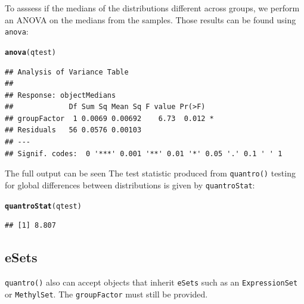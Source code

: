 \documentclass{article}\usepackage[]{graphicx}\usepackage[usenames,dvipsnames]{color}
\makeatletter
\newcommand{\hlstd}[1]{\textcolor[rgb]{0.345,0.345,0.345}{#1}}%
\newcommand{\hlkwd}[1]{\textcolor[rgb]{0.737,0.353,0.396}{\textbf{#1}}}%
\newenvironment{kframe}{%
 \def\at@end@of@kframe{}%
 \ifinner\ifhmode%
  \def\at@end@of@kframe{\end{minipage}}%
  \begin{minipage}{\columnwidth}%
 \fi\fi%
 \def\FrameCommand##1{\hskip\@totalleftmargin \hskip-\fboxsep
 \colorbox{shadecolor}{##1}\hskip-\fboxsep
     \hskip-\linewidth \hskip-\@totalleftmargin \hskip\columnwidth}%
 \MakeFramed {\advance\hsize-\width
   \@totalleftmargin\z@ \linewidth\hsize
   \@setminipage}}%
 {\par\unskip\endMakeFramed%
 \at@end@of@kframe}
\newenvironment{knitrout}{}{} %
\makeatother
\begin{document}
To asssess if the medians of the distributions different across groups, 
we perform an ANOVA on the medians from the samples. Those results can be 
found using \texttt{anova}:

\begin{knitrout}
\color{fgcolor}\begin{kframe}
\begin{alltt}
\hlkwd{anova}\hlstd{(qtest)}
\end{alltt}
\begin{verbatim}
## Analysis of Variance Table
## 
## Response: objectMedians
##             Df Sum Sq Mean Sq F value Pr(>F)  
## groupFactor  1 0.0069 0.00692    6.73  0.012 *
## Residuals   56 0.0576 0.00103                 
## ---
## Signif. codes:  0 '***' 0.001 '**' 0.01 '*' 0.05 '.' 0.1 ' ' 1
\end{verbatim}
\end{kframe}
\end{knitrout}

The full output can be seen The test statistic produced from 
\texttt{quantro()} testing for global differences between distributions 
is given by \texttt{quantroStat}: 

\begin{knitrout}
\color{fgcolor}\begin{kframe}
\begin{alltt}
\hlkwd{quantroStat}\hlstd{(qtest)}
\end{alltt}
\begin{verbatim}
## [1] 8.807
\end{verbatim}
\end{kframe}
\end{knitrout}


\subsection{eSets}
\texttt{quantro()} also can accept objects that inherit \texttt{eSets} 
such as an \texttt{ExpressionSet} or \texttt{MethylSet}. The 
\texttt{groupFactor} must still be provided.  
\end{document}
